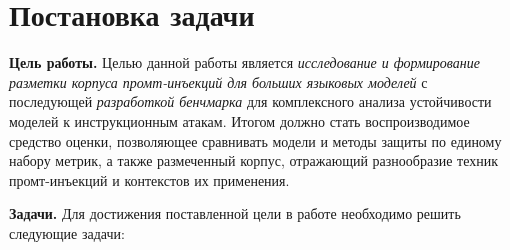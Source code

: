 
\section{Постановка задачи}
\label{sec:task}

\textbf{Цель работы.}
Целью данной работы является \emph{исследование и формирование разметки корпуса промт-инъекций для больших языковых моделей} с последующей \emph{разработкой бенчмарка} для комплексного анализа устойчивости моделей к инструкционным атакам. Итогом должно стать воспроизводимое средство оценки, позволяющее сравнивать модели и методы защиты по единому набору метрик, а также размеченный корпус, отражающий разнообразие техник промт-инъекций и контекстов их применения.

\textbf{Задачи.}
Для достижения поставленной цели в работе необходимо решить следующие задачи:
